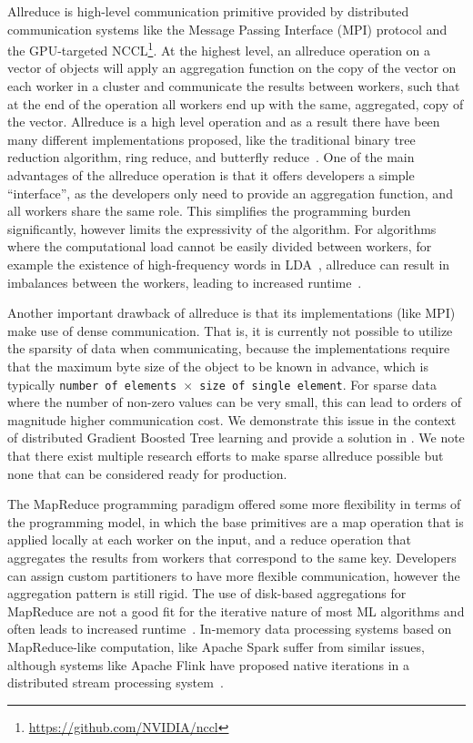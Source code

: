 Allreduce is high-level communication primitive provided by distributed communication
systems like the Message Passing Interface (MPI) protocol \cite{mpi} and the
GPU-targeted NCCL\footnote{\url{https://github.com/NVIDIA/nccl}}. At the highest
level, an allreduce operation on a vector of objects will apply an aggregation
function on the copy of the vector on each worker in a cluster and communicate
the results between workers, such that at the end of the operation all workers end up with the same,
aggregated, copy of the vector. Allreduce is a high level operation and as a result there have been
many different implementations proposed, like the traditional
binary tree reduction algorithm, ring reduce, and butterfly reduce~\cite{allreduce}.
One of the main advantages of the allreduce operation is that it offers developers a simple ``interface'', as the developers only need to provide an aggregation function,
and all workers share the same role.
This simplifies the programming burden significantly, however limits the expressivity
of the algorithm. For algorithms where the computational load cannot be easily divided between
workers, for example the existence of high-frequency words in LDA~\cite{lightLDA}, allreduce can result
in imbalances between the workers, leading to increased runtime~\cite{straggler-ml, stale-sync-ps}.

Another important drawback of allreduce is that its implementations (like MPI) make use of dense communication. That is, it is currently
not possible to utilize the sparsity of data when communicating, because the implementations
require that the maximum byte size of the object to be known in advance, which is
typically \texttt{number of elements $\times$ size of single element}. For sparse
data where the number of non-zero values can be very small, this can lead to orders
of magnitude higher communication cost. We demonstrate this issue in the context
of distributed Gradient Boosted Tree learning and provide
a solution in \blockgbt. We note that there exist multiple research
efforts to make sparse allreduce possible \cite{sparse-comms-ml, sparse-allreduce, sparse-mpi}
but none that can be considered ready for production.


The MapReduce programming paradigm \cite{mapreduce} offered some more flexibility in terms of the
programming model, in which the base primitives are a map operation that is applied
locally at each worker on the input, and a reduce operation that aggregates the results
from workers that correspond to the same key. Developers can assign custom partitioners
to have more flexible communication, however the aggregation pattern is still rigid.
The use of disk-based aggregations for MapReduce are not a good fit for the iterative
nature of most ML algorithms and often leads to increased runtime~\cite{slow-learners-fast}.
In-memory data processing systems based on MapReduce-like computation, like Apache Spark \cite{spark}
suffer from similar issues, although systems like Apache Flink have proposed native iterations
in a distributed stream processing system~\cite{flink-iterations}.

